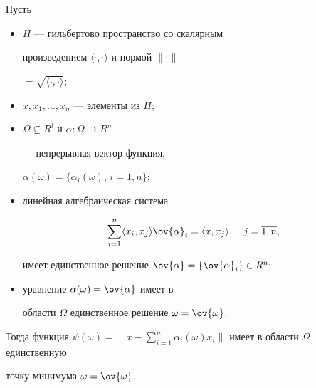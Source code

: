 \begin{lem}


Пусть


\begin{itemize}


\item[а)] $H$ --- гильбертово пространство со скалярным


произведением $\langle\cdot,\cdot\rangle$ и нормой $\|\cdot\|$


$=\sqrt{\langle\cdot,\cdot\rangle};$


\item[б)] $x,x_1,\dotsc,x_n$ --- элементы из $H;$


\item[в)] $\Omega\subseteq R^l$ и $\alpha:\Omega\to R^n$


--- непрерывная вектор-функция,


$\alpha(\omega)=\{\alpha_i(\omega)$, $i=\overline{1,n}\};$


\item[г)]  линейная алгебраическая система


\begin{equation}


\sum\limits^n_{i=1}\langle x_i,x_j\rangle\ov{\alpha}_i=\langle


x,x_j\rangle,\quad j=\overline{1,n},


\end{equation}


имеет единственное решение $\ov{\alpha}=\{\ov{\alpha}_i\}\in


R^n;$


\item[д)] уравнение $\alpha(\omega)=\ov{\alpha}$ имеет в


области $\Omega$ единственное решение $\omega=\ov{\omega}$.


\end{itemize}





Тогда функция $\psi(\omega)=\Big\|x-\sum\limits^n_{i=1}


\alpha_i(\omega)x_i\Big\|$ имеет в области $\Omega$ единственную


точку минимума $\omega=\ov{\omega}$.


\end{lem}






